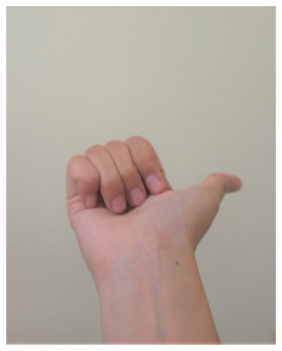 \documentclass[conference]{IEEEtran}
\begin{document}
\begin{figure} [h]
\begin{center}
\begin{subfigure}[t]{0.11\textwidth}
				\includegraphics[width=\textwidth]{img/pola5b.jpg}
				\caption{\label{fig:gs5b}}
			\end{subfigure}
			\hspace{0.1em}
			\begin{subfigure}[t]{0.11\textwidth}
				\centering

\end{subfigure}
\end{center}
\end{figure}
\end{document}

